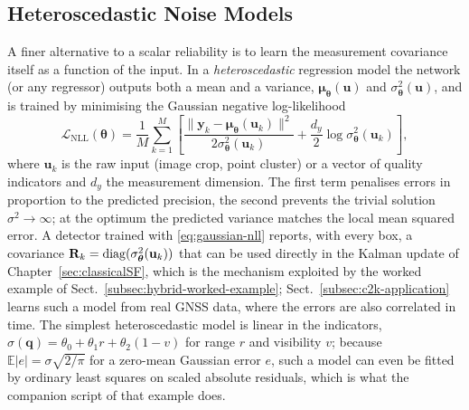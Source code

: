 \subsection{Heteroscedastic Noise Models}
\label{subsec:heteroscedastic}
A finer alternative to a scalar reliability is to learn the measurement covariance itself as a function of the input. In a \emph{heteroscedastic} regression model the network (or any regressor) outputs both a mean and a variance, $\boldsymbol{\mu}_{\boldsymbol{\theta}}(\mathbf{u})$ and $\sigma_{\boldsymbol{\theta}}^{2}(\mathbf{u})$, and is trained by minimising the Gaussian negative log-likelihood \cite{nix1994_heteroscedastic,kendall2017_uncertainties}
\begin{equation}
\mathcal{L}_{\mathrm{NLL}}(\boldsymbol{\theta})=\frac{1}{M}\sum_{k=1}^{M}\left[\frac{\|\mathbf{y}_k-\boldsymbol{\mu}_{\boldsymbol{\theta}}(\mathbf{u}_k)\|^{2}}{2\sigma_{\boldsymbol{\theta}}^{2}(\mathbf{u}_k)}+\frac{d_y}{2}\log\sigma_{\boldsymbol{\theta}}^{2}(\mathbf{u}_k)\right],
\label{eq:gaussian-nll}
\end{equation}
where $\mathbf{u}_k$ is the raw input (image crop, point cluster) or a vector of quality indicators and $d_y$ the measurement dimension. The first term penalises errors in proportion to the predicted precision, the second prevents the trivial solution $\sigma^{2}\to\infty$; at the optimum the predicted variance matches the local mean squared error. A detector trained with \eqref{eq:gaussian-nll} reports, with every box, a covariance $\mathbf{R}_k=\operatorname{diag}(\sigma_{\boldsymbol{\theta}}^{2}(\mathbf{u}_k))$ that can be used directly in the Kalman update of Chapter~\ref{sec:classicalSF}, which is the mechanism exploited by the worked example of Sect.~\ref{subsec:hybrid-worked-example}; Sect.~\ref{subsec:c2k-application} learns such a model from real GNSS data, where the errors are also correlated in time. The simplest heteroscedastic model is linear in the indicators, $\sigma(\mathbf{q})=\theta_0+\theta_1 r+\theta_2(1-v)$ for range $r$ and visibility $v$; because $\mathbb{E}|e|=\sigma\sqrt{2/\pi}$ for a zero-mean Gaussian error $e$, such a model can even be fitted by ordinary least squares on scaled absolute residuals, which is what the companion script of that example does.

